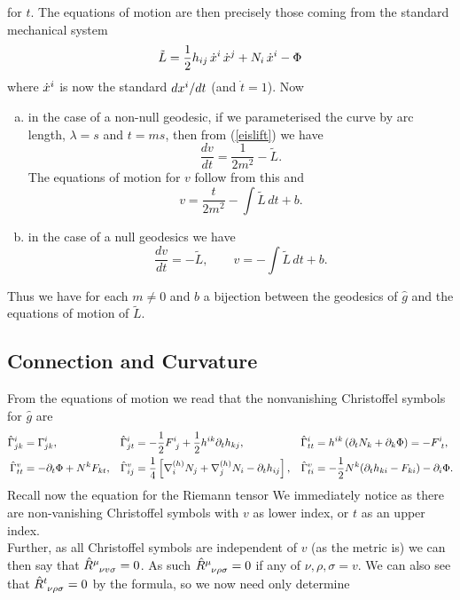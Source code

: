 \documentclass{article}
\begin{document}
for $t$. The equations of motion are then precisely those coming from the standard mechanical system
$$\tilde L= \frac12 h_{ij}\, \dot x\sp{i}\, \dot x\sp{j}+N_i \,\dot x\sp{i}-\Phi $$
where $ \dot x\sp{i}$ is now the standard $d x\sp{i}/dt$ (and $\dot t = 1$). Now
\begin{enumerate}[(a)]
	\item in the case of a non-null geodesic, if we parameterised the curve by arc length, $\lambda=s$ and $t =ms$, then from (\ref{eislift}) we have 
	$$\frac{dv}{dt}= \frac1{2m^2} -\tilde L.$$
	The equations of motion for $v$ follow from this and
	$$v=\frac{t}{2m^2}-\int \tilde L\, dt +b.$$
	\item in the case of a null geodesics we have
	$$\frac{dv}{dt}=  -\tilde L,\qquad  v=-\int \tilde L\, dt +b.$$
\end{enumerate}
Thus we have for each $m\ne0$ and $b$ a bijection between the geodesics of $\hat g$ and the
equations of motion of $\tilde L$.
\subsection{Connection and Curvature}
From the equations of motion we read that the nonvanishing Christoffel symbols for $\hat g$ are
\begin{align*}
\hat \Gamma\sp{i}_{jk}&=  \Gamma\sp{i}_{jk},
&\hat \Gamma\sp{i}_{jt}&=-\frac12 F\sp{i}_{\ j}+\frac12 h\sp{ik}\partial_t h_{kj},
&\hat \Gamma\sp{i}_{tt}&=h\sp{ik} \left( \partial_t N_k +\partial_{k} \Phi \right)= -F\sp{i}_{\ t},
\\
\hat \Gamma\sp{v}_{tt}&=-\partial_t \Phi+N\sp{k}F_{kt}, 
&\hat \Gamma\sp{v}_{ij}&=\frac14\left[\nabla\sp{(h)}_{i}N_{j}+\nabla\sp{(h)}_{j}N_{i}-\partial_t h_{ij}\right],
&\hat \Gamma\sp{v}_{ti}&=-\frac12 N\sp{k} (\partial_t h_{ki} -F_{ki}) -\partial_i\Phi .
\end{align*}
Recall now the equation for the Riemann tensor 
We immediately notice 
as there are non-vanishing Christoffel symbols with $v$ as lower index, or $t$ as an upper index. \\
Further, as all Christoffel symbols are independent of $v$ (as the metric is) we can then say that $\hat{R}\indices{^\mu_\nu_v_\sigma} = 0$. As such $\hat{R}\indices{^\mu_\nu_\rho_\sigma}=0$ if any of $\nu,\rho,\sigma=v$. We can also see that $\hat{R}\indices{^t_\nu_\rho_\sigma}=0$ by the formula, so we now need only determine
\end{document}
